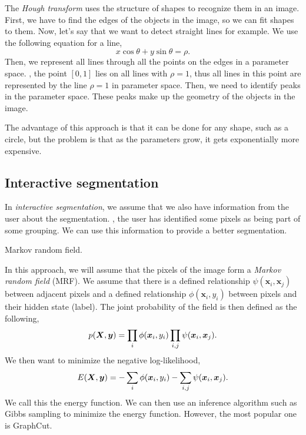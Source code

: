 The \textit{Hough transform} uses the structure of shapes to recognize them in
an image. First, we have to find the edges of the objects in the image, so we
can fit shapes to them. Now, let's say that we want to detect straight lines
for example. We use the following equation for a line, \[
  x\cos\theta + y\sin\theta = \rho
.\]
Then, we represent all lines through all the points on the edges in a
parameter space. \Eg, the point $[0,1]$ lies on all lines with $\rho=1$, thus
all lines in this point are represented by the line $\rho=1$ in parameter
space. Then, we need to identify peaks in the parameter space. These peaks
make up the geometry of the objects in the image.

The advantage of this approach is that it can be done for any shape, such as
a circle, but the problem is that as the parameters grow, it gets
exponentially more expensive.

\subsection{Interactive segmentation}

In \textit{interactive segmentation}, we assume that we also have information
from the user about the segmentation. \Ie, the user has identified some pixels
as being part of some grouping. We can use this information to provide a better
segmentation.

\begin{marginfigure}
    \centering
    \caption{Markov random field.}
    \label{fig:mrf}
\end{marginfigure}

In this approach, we will assume that the pixels of the image form a
\textit{Markov random field} (MRF). We assume that there is a defined
relationship $\psi(\bm{x}_i,\bm{x}_j)$ between adjacent pixels and a defined
relationship $\phi(\bm{x}_i,y_i)$ between pixels and their hidden state
(label). The joint probability of the field is then defined as the following,
\[
  p(\bm{X},\bm{y}) = \prod_i \phi(\bm{x}_i,y_i) \prod_{i,j} \psi(\bm{x}_i,\bm{x}_j)
.\]
We then want to minimize the negative log-likelihood, \[
  E(\bm{X},\bm{y}) = -\sum_i \phi(\bm{x}_i,y_i) -\sum_{i,j} \psi(\bm{x}_i,\bm{x}_j)
.\]
We call this the energy function. We can then use an inference algorithm such
as Gibbs sampling to minimize the energy function. However, the most popular
one is GraphCut.

